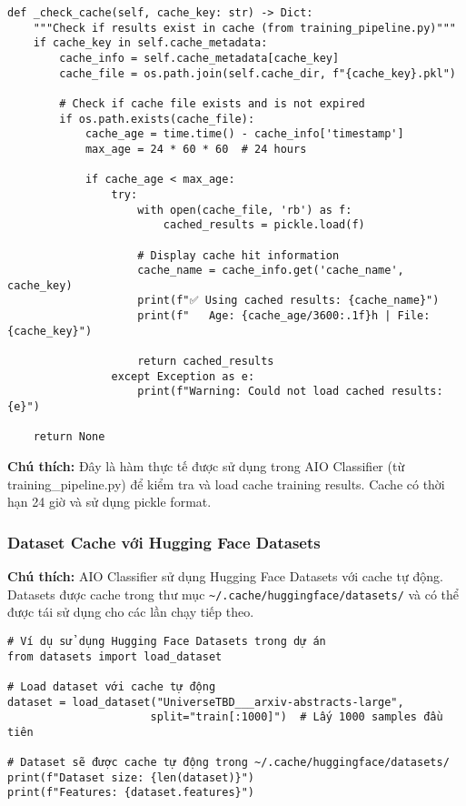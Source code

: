 \begin{verbatim}
def _check_cache(self, cache_key: str) -> Dict:
    """Check if results exist in cache (from training_pipeline.py)"""
    if cache_key in self.cache_metadata:
        cache_info = self.cache_metadata[cache_key]
        cache_file = os.path.join(self.cache_dir, f"{cache_key}.pkl")
        
        # Check if cache file exists and is not expired
        if os.path.exists(cache_file):
            cache_age = time.time() - cache_info['timestamp']
            max_age = 24 * 60 * 60  # 24 hours
            
            if cache_age < max_age:
                try:
                    with open(cache_file, 'rb') as f:
                        cached_results = pickle.load(f)
                    
                    # Display cache hit information
                    cache_name = cache_info.get('cache_name', cache_key)
                    print(f"✅ Using cached results: {cache_name}")
                    print(f"   Age: {cache_age/3600:.1f}h | File: {cache_key}")
                    
                    return cached_results
                except Exception as e:
                    print(f"Warning: Could not load cached results: {e}")
    
    return None
\end{verbatim}

\textbf{Chú thích:} Đây là hàm thực tế được sử dụng trong AIO Classifier (từ training\_pipeline.py) để kiểm tra và load cache training results. Cache có thời hạn 24 giờ và sử dụng pickle format.

\subsubsection{Dataset Cache với Hugging Face Datasets}

\textbf{Chú thích:} AIO Classifier sử dụng Hugging Face Datasets với cache tự động. Datasets được cache trong thư mục \texttt{\textasciitilde/.cache/huggingface/datasets/} và có thể được tái sử dụng cho các lần chạy tiếp theo.

\begin{verbatim}
# Ví dụ sử dụng Hugging Face Datasets trong dự án
from datasets import load_dataset

# Load dataset với cache tự động
dataset = load_dataset("UniverseTBD___arxiv-abstracts-large", 
                      split="train[:1000]")  # Lấy 1000 samples đầu tiên

# Dataset sẽ được cache tự động trong ~/.cache/huggingface/datasets/
print(f"Dataset size: {len(dataset)}")
print(f"Features: {dataset.features}")
\end{verbatim}

